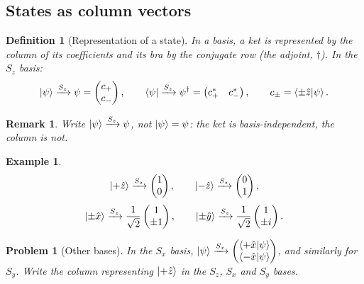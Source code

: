\documentclass{article}
\newtheorem{definition}{Definition}
\newtheorem{problem}{Problem}
\newtheorem*{example}{Example}
\newtheorem{remark}{Remark}
\begin{document}
\subsection{States as column vectors}
\begin{definition}[Representation of a state]
    In a basis, a ket is represented by the column of its coefficients and its bra by the conjugate row (the adjoint, $\dagger$). In the $S_z$ basis:
    \begin{equation}
        \ket{\psi} \xrightarrow{S_z} \psi = \begin{pmatrix} c_+ \\ c_- \end{pmatrix}, \qquad
        \bra{\psi} \xrightarrow{S_z} \psi^\dagger = \begin{pmatrix} c_+^* & c_-^* \end{pmatrix}, \qquad c_\pm = \braket{\pm\hat{z}|\psi}.
    \end{equation}
\end{definition}
\begin{remark}
    Write $\ket{\psi} \xrightarrow{S_z} \psi$, not $\ket{\psi} = \psi$: the ket is basis-independent, the column is not.
\end{remark}
\begin{example}
    \[\ket{+\hat{z}} \xrightarrow{S_z} \begin{pmatrix} 1 \\ 0 \end{pmatrix}, \qquad \ket{-\hat{z}} \xrightarrow{S_z} \begin{pmatrix} 0 \\ 1 \end{pmatrix},\]
    \[\ket{\pm\hat{x}} \xrightarrow{S_z} \frac{1}{\sqrt{2}}\begin{pmatrix} 1 \\ \pm 1 \end{pmatrix}, \qquad \ket{\pm\hat{y}} \xrightarrow{S_z} \frac{1}{\sqrt{2}}\begin{pmatrix} 1 \\ \pm i \end{pmatrix}.\]
\end{example}
\begin{problem}[Other bases]
    In the $S_x$ basis, $\ket{\psi} \xrightarrow{S_x} \begin{pmatrix} \braket{+\hat{x}|\psi} \\ \braket{-\hat{x}|\psi} \end{pmatrix}$, and similarly for $S_y$. Write the column representing $\ket{+\hat{z}}$ in the $S_z$, $S_x$ and $S_y$ bases.
\end{problem}
\end{document}
